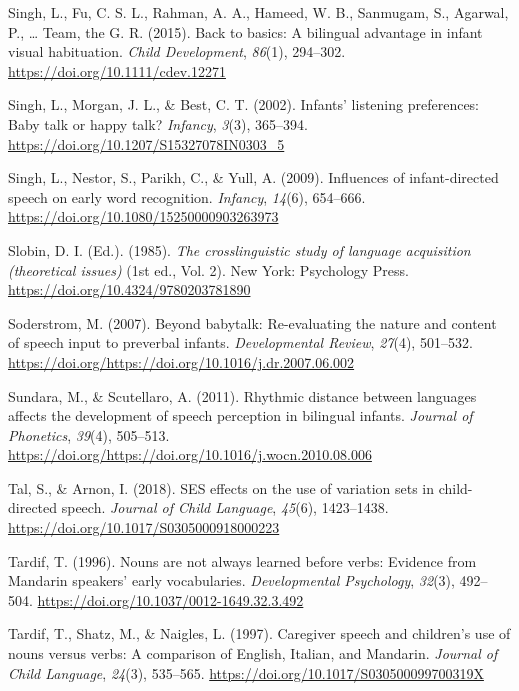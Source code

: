 \documentclass[,man,floatsintext]{apa6}
\begin{document}
\leavevmode\hypertarget{ref-singh_2015}{}%
Singh, L., Fu, C. S. L., Rahman, A. A., Hameed, W. B., Sanmugam, S., Agarwal, P., \ldots{} Team, the G. R. (2015). Back to basics: A bilingual advantage in infant visual habituation. \emph{Child Development}, \emph{86}(1), 294--302. \url{https://doi.org/10.1111/cdev.12271}

\leavevmode\hypertarget{ref-singh_2002}{}%
Singh, L., Morgan, J. L., \& Best, C. T. (2002). Infants' listening preferences: Baby talk or happy talk? \emph{Infancy}, \emph{3}(3), 365--394. \url{https://doi.org/10.1207/S15327078IN0303_5}

\leavevmode\hypertarget{ref-singh_2009}{}%
Singh, L., Nestor, S., Parikh, C., \& Yull, A. (2009). Influences of infant-directed speech on early word recognition. \emph{Infancy}, \emph{14}(6), 654--666. \url{https://doi.org/10.1080/15250000903263973}

\leavevmode\hypertarget{ref-slobin_1985}{}%
Slobin, D. I. (Ed.). (1985). \emph{The crosslinguistic study of language acquisition (theoretical issues)} (1st ed., Vol. 2). New York: Psychology Press. \url{https://doi.org/10.4324/9780203781890}

\leavevmode\hypertarget{ref-soderstrom_2007}{}%
Soderstrom, M. (2007). Beyond babytalk: Re-evaluating the nature and content of speech input to preverbal infants. \emph{Developmental Review}, \emph{27}(4), 501--532. \url{https://doi.org/https://doi.org/10.1016/j.dr.2007.06.002}

\leavevmode\hypertarget{ref-sundara_2011}{}%
Sundara, M., \& Scutellaro, A. (2011). Rhythmic distance between languages affects the development of speech perception in bilingual infants. \emph{Journal of Phonetics}, \emph{39}(4), 505--513. \url{https://doi.org/https://doi.org/10.1016/j.wocn.2010.08.006}

\leavevmode\hypertarget{ref-tal_2018}{}%
Tal, S., \& Arnon, I. (2018). SES effects on the use of variation sets in child-directed speech. \emph{Journal of Child Language}, \emph{45}(6), 1423--1438. \url{https://doi.org/10.1017/S0305000918000223}

\leavevmode\hypertarget{ref-tardif_1996}{}%
Tardif, T. (1996). Nouns are not always learned before verbs: Evidence from Mandarin speakers' early vocabularies. \emph{Developmental Psychology}, \emph{32}(3), 492--504. \url{https://doi.org/10.1037/0012-1649.32.3.492}

\leavevmode\hypertarget{ref-tardif_1997}{}%
Tardif, T., Shatz, M., \& Naigles, L. (1997). Caregiver speech and children's use of nouns versus verbs: A comparison of English, Italian, and Mandarin. \emph{Journal of Child Language}, \emph{24}(3), 535--565. \url{https://doi.org/10.1017/S030500099700319X}
\end{document}
